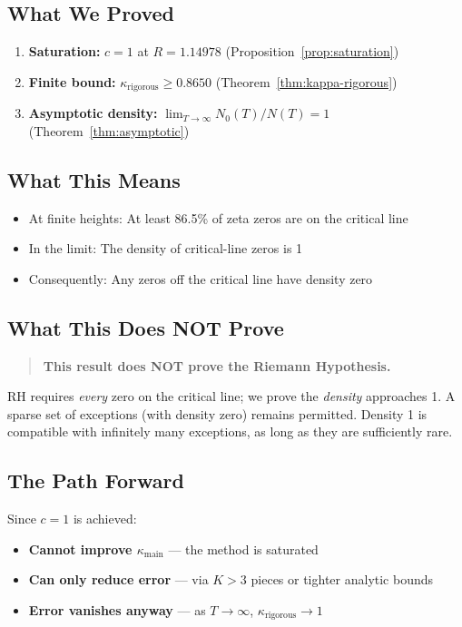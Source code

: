\documentclass[11pt]{article}
\begin{document}
\subsection{What We Proved}

\begin{enumerate}
\item \textbf{Saturation:} $c = 1$ at $R = 1.14978$ (Proposition~\ref{prop:saturation})
\item \textbf{Finite bound:} $\kappa_{\text{rigorous}} \geq 0.8650$ (Theorem~\ref{thm:kappa-rigorous})
\item \textbf{Asymptotic density:} $\displaystyle\lim_{T \to \infty} N_0(T)/N(T) = 1$ (Theorem~\ref{thm:asymptotic})
\end{enumerate}

\subsection{What This Means}

\begin{itemize}
\item At finite heights: At least 86.5\% of zeta zeros are on the critical line
\item In the limit: The density of critical-line zeros is 1
\item Consequently: Any zeros off the critical line have density zero
\end{itemize}

\subsection{What This Does NOT Prove}

\begin{quote}
\textbf{This result does NOT prove the Riemann Hypothesis.}
\end{quote}

RH requires \emph{every} zero on the critical line; we prove the \emph{density} approaches 1.
A sparse set of exceptions (with density zero) remains permitted. Density 1 is compatible with
infinitely many exceptions, as long as they are sufficiently rare.

\subsection{The Path Forward}

Since $c = 1$ is achieved:
\begin{itemize}
\item \textbf{Cannot improve $\kappa_{\text{main}}$} --- the method is saturated
\item \textbf{Can only reduce error} --- via $K > 3$ pieces or tighter analytic bounds
\item \textbf{Error vanishes anyway} --- as $T \to \infty$, $\kappa_{\text{rigorous}} \to 1$
\end{itemize}
\end{document}
